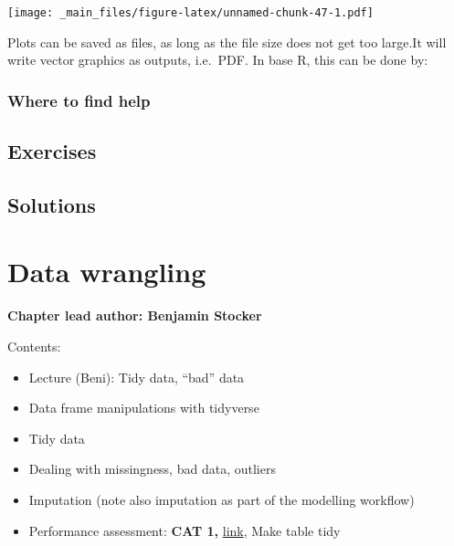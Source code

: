 \documentclass[
]{book}
\newenvironment{Shaded}{\begin{snugshade}}{\end{snugshade}}
\newcommand{\AttributeTok}[1]{\textcolor[rgb]{0.77,0.63,0.00}{#1}}
\newcommand{\FunctionTok}[1]{\textcolor[rgb]{0.00,0.00,0.00}{#1}}
\newcommand{\NormalTok}[1]{#1}
\newcommand{\SpecialCharTok}[1]{\textcolor[rgb]{0.00,0.00,0.00}{#1}}
\newcommand{\StringTok}[1]{\textcolor[rgb]{0.31,0.60,0.02}{#1}}
\providecommand{\tightlist}{%
  \setlength{\itemsep}{0pt}\setlength{\parskip}{0pt}}
\begin{document}
\begin{Shaded}
\end{Shaded}

\texttt{[image: \_main\_files/figure-latex/unnamed-chunk-47-1.pdf]}

Plots can be saved as files, as long as the file size does not get too large.It will write vector graphics as outputs, i.e.~PDF. In base R, this can be done by:

\begin{Shaded}
\end{Shaded}

\hypertarget{where-to-find-help}{%
\subsection{Where to find help}\label{where-to-find-help}}

\hypertarget{exercises-1}{%
\section{Exercises}\label{exercises-1}}

\hypertarget{solutions-1}{%
\section{Solutions}\label{solutions-1}}

\hypertarget{data_wrangling}{%
\chapter{Data wrangling}\label{data_wrangling}}

\textbf{Chapter lead author: Benjamin Stocker}

Contents:

\begin{itemize}
\tightlist
\item
  Lecture (Beni): Tidy data, ``bad'' data
\item
  Data frame manipulations with tidyverse
\item
  Tidy data
\item
  Dealing with missingness, bad data, outliers
\item
  Imputation (note also imputation as part of the modelling workflow)
\item
  Performance assessment: \textbf{CAT 1,} \href{https://stineb.github.io/esds_book/ch-02.html\#exercise-1}{link}, Make table tidy
\end{itemize}
\end{document}
